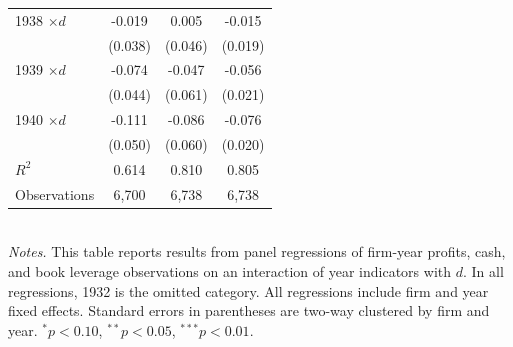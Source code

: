 \begin{table}[p]
\begin{tabular}{lccc}
1938 $\times d$ & -0.019          & 0.005  & -0.015 \\
                & (0.038)         & (0.046) & (0.019) \\
1939 $\times d$ & -0.074          & -0.047 & -0.056\sym{**} \\
                & (0.044)         & (0.061) & (0.021) \\
1940 $\times d$ & -0.111\sym{**}  & -0.086 & -0.076\sym{***} \\
                & (0.050)         & (0.060) & (0.020) \\
\midrule
$R^2$           & 0.614 & 0.810 & 0.805 \\
Observations    & 6{,}700 & 6{,}738 & 6{,}738 \\
\bottomrule
\end{tabular}\\

\vspace*{3mm} \justifying \noindent
\footnotesize{\textit{Notes.} This table reports results from panel regressions of firm-year profits, cash, and book leverage observations on an interaction of year indicators with $d$. In all regressions, 1932 is the omitted category. All regressions include firm and year fixed effects. Standard errors in parentheses are two-way clustered by firm and year. $^{*}p<0.10$, $^{**}p<0.05$, $^{***}p<0.01$.}
\end{table}